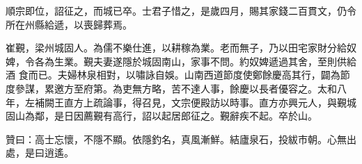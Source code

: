 \begin{pinyinscope}
 順宗即位，詔征之，而城已卒。士君子惜之，是歲四月，賜其家錢二百貫文，仍令所在州縣給遞，以喪歸葬焉。



 崔覲，梁州城固人。為儒不樂仕進，以耕稼為業。老而無子，乃以田宅家財分給奴婢，令各為生業。覲夫妻遂隱於城固南山，家事不問。約奴婢遞過其舍，至則供給酒
 食而已。夫婦林泉相對，以嘯詠自娛。山南西道節度使鄭餘慶高其行，闢為節度參謀，累邀方至府第。為吏無方略，苦不達人事，餘慶以長者優容之。太和八年，左補闕王直方上疏論事，得召見，文宗便殿訪以時事。直方亦興元人，與覲城固山為鄰，是日因薦覲有高行，詔以起居郎征之。覲辭疾不起。卒於山。



 贊曰：高士忘懷，不隱不顯。依隱釣名，真風漸鮮。結廬泉石，投紱市朝。心無出處，是曰逍遙。



\end{pinyinscope}